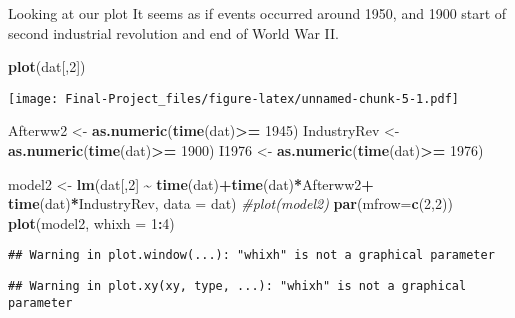 \documentclass[
]{article}
\newenvironment{Shaded}{\begin{snugshade}}{\end{snugshade}}
\newcommand{\AttributeTok}[1]{\textcolor[rgb]{0.13,0.29,0.53}{#1}}
\newcommand{\CommentTok}[1]{\textcolor[rgb]{0.56,0.35,0.01}{\textit{#1}}}
\newcommand{\DecValTok}[1]{\textcolor[rgb]{0.00,0.00,0.81}{#1}}
\newcommand{\FunctionTok}[1]{\textcolor[rgb]{0.13,0.29,0.53}{\textbf{#1}}}
\newcommand{\NormalTok}[1]{#1}
\newcommand{\OtherTok}[1]{\textcolor[rgb]{0.56,0.35,0.01}{#1}}
\newcommand{\SpecialCharTok}[1]{\textcolor[rgb]{0.81,0.36,0.00}{\textbf{#1}}}
\begin{document}
Looking at our plot It seems as if events occurred around 1950, and 1900
start of second industrial revolution and end of World War II.

\begin{Shaded}
\begin{Highlighting}[]
\FunctionTok{plot}\NormalTok{(dat[,}\DecValTok{2}\NormalTok{])}
\end{Highlighting}
\end{Shaded}

\texttt{[image: Final-Project\_files/figure-latex/unnamed-chunk-5-1.pdf]}

\begin{Shaded}
\begin{Highlighting}[]
\NormalTok{Afterww2 }\OtherTok{\textless{}{-}} \FunctionTok{as.numeric}\NormalTok{(}\FunctionTok{time}\NormalTok{(dat)}\SpecialCharTok{\textgreater{}=} \DecValTok{1945}\NormalTok{)}
\NormalTok{IndustryRev }\OtherTok{\textless{}{-}} \FunctionTok{as.numeric}\NormalTok{(}\FunctionTok{time}\NormalTok{(dat)}\SpecialCharTok{\textgreater{}=} \DecValTok{1900}\NormalTok{)}
\NormalTok{I1976 }\OtherTok{\textless{}{-}} \FunctionTok{as.numeric}\NormalTok{(}\FunctionTok{time}\NormalTok{(dat)}\SpecialCharTok{\textgreater{}=} \DecValTok{1976}\NormalTok{)}

\NormalTok{model2 }\OtherTok{\textless{}{-}} \FunctionTok{lm}\NormalTok{(dat[,}\DecValTok{2}\NormalTok{] }\SpecialCharTok{\textasciitilde{}} \FunctionTok{time}\NormalTok{(dat)}\SpecialCharTok{+}\FunctionTok{time}\NormalTok{(dat)}\SpecialCharTok{*}\NormalTok{Afterww2}\SpecialCharTok{+} \FunctionTok{time}\NormalTok{(dat)}\SpecialCharTok{*}\NormalTok{IndustryRev, }\AttributeTok{data =}\NormalTok{ dat)}
\CommentTok{\#plot(model2)}
\FunctionTok{par}\NormalTok{(}\AttributeTok{mfrow=}\FunctionTok{c}\NormalTok{(}\DecValTok{2}\NormalTok{,}\DecValTok{2}\NormalTok{))}
\FunctionTok{plot}\NormalTok{(model2, }\AttributeTok{whixh =} \DecValTok{1}\SpecialCharTok{:}\DecValTok{4}\NormalTok{)}
\end{Highlighting}
\end{Shaded}

\begin{verbatim}
## Warning in plot.window(...): "whixh" is not a graphical parameter
\end{verbatim}

\begin{verbatim}
## Warning in plot.xy(xy, type, ...): "whixh" is not a graphical parameter
\end{verbatim}
\end{document}
